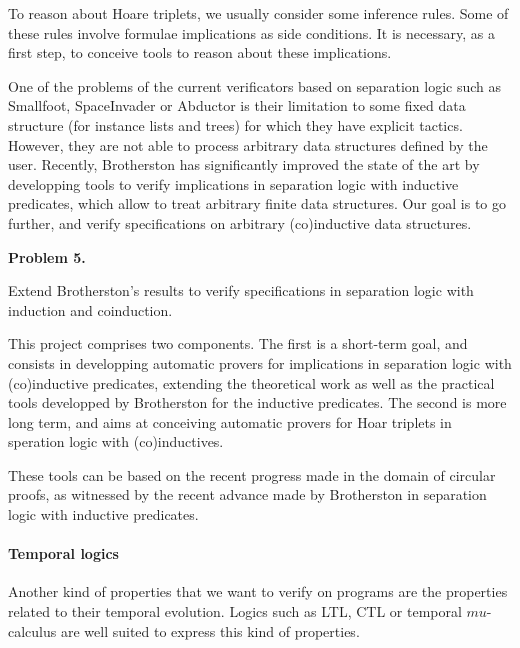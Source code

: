 \documentclass[11pt,twocolumn]{article}
\begin{document}
To reason about Hoare triplets, we usually consider some inference rules. Some of these rules 
involve formulae implications as side conditions. It is necessary, as a first step, to conceive tools to reason about these implications.

One of the problems of the current verificators based on separation logic such as Smallfoot\cite{BerdineCO05},
SpaceInvader \cite{DistefanoOY06} or Abductor \cite{CalcagnoDOY11} is their limitation to some fixed data structure (for instance lists and trees) for which they have explicit tactics. However, they are not able to process arbitrary data structures defined by the user. Recently, Brotherston has significantly improved the state of the art by developping tools to verify implications in separation logic with inductive predicates, which allow to treat 
arbitrary finite data structures. Our goal is to go further, and verify specifications on arbitrary (co)inductive data structures. 


\begin{center}
\begin{bclogo}[logo= ,arrondi = 0.1, couleur = green!10,  epBarre = 0]{}
  \vspace{-10pt}
  \textbf{Problem 5.}
  
  Extend Brotherston's results to verify specifications in separation logic with induction and coinduction.
\end{bclogo}
\end{center}

This project comprises two components. The first is a short-term goal, and consists in developping automatic provers 
for implications in separation logic with (co)inductive predicates, extending the theoretical work as well as the practical tools developped by Brotherston for the inductive predicates. The second is more long term, and aims at conceiving automatic provers for Hoar triplets in speration logic with (co)inductives. 

These tools can be based on the recent progress made in the domain of circular proofs, as witnessed  by the recent advance made by Brotherston in separation logic with inductive predicates.


\paragraph{Temporal logics}

Another kind of properties that we want to verify on programs are the properties related to their temporal evolution. Logics such as LTL, CTL or temporal $mu$-calculus are well suited to express this kind of properties. 
\end{document}
